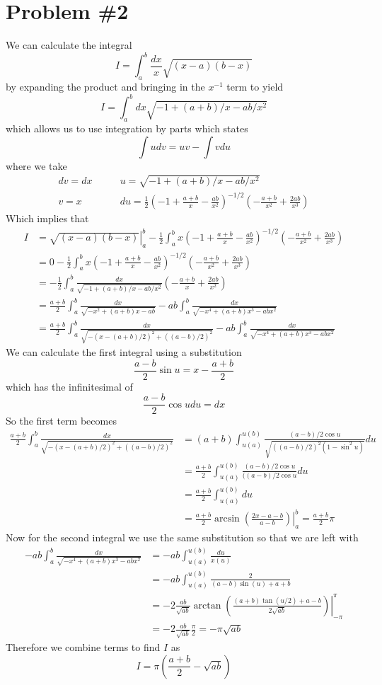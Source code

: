 \documentclass[11pt]{article}
\numberwithin{equation}{section}
\begin{document}
\pagebreak

\section{Problem \#2}
We can calculate the integral
$$I = \int_{a}^{b} \frac{dx}{x}\sqrt{(x-a)(b-x)}$$
by expanding the product and bringing in the $x^{-1}$ term to yield
$$I = \int_{a}^{b}dx\sqrt{-1+(a+b)/x-ab/x^2}$$
which allows us to use integration by parts which states 
$$\int udv = uv - \int vdu$$
where we take
\begin{align*}
dv = dx &\qquad u = \sqrt{-1+(a+b)/x-ab/x^2}\\
v = x &\qquad du = \frac{1}{2}\left(-1+\frac{a+b}{x}-\frac{ab}{x^2}\right)^{-1/2}\left(-\frac{a+b}{x^2}+\frac{2ab}{x^3}\right)
\end{align*}
Which implies that
\begin{align*}
I &= \left.\sqrt{(x-a)(b-x)}\right|_{a}^{b} - \frac{1}{2}\int_{a}^{b}x\left(-1+\frac{a+b}{x}-\frac{ab}{x^2}\right)^{-1/2}\left(-\frac{a+b}{x^2}+\frac{2ab}{x^3}\right)\\
&= 0 - \frac{1}{2}\int_{a}^{b}x\left(-1+\frac{a+b}{x}-\frac{ab}{x^2}\right)^{-1/2}\left(-\frac{a+b}{x^2}+\frac{2ab}{x^3}\right)\\
&= - \frac{1}{2}\int_{a}^{b}\frac{dx}{\sqrt{-1+(a+b)/{x}-{ab}/{x^2}}}\left(-\frac{a+b}{x}+\frac{2ab}{x^2}\right)\\
&= \frac{a+b}{2}\int_{a}^{b}\frac{dx}{\sqrt{-x^2+(a+b)x-ab}} - ab\int_{a}^{b}\frac{dx}{\sqrt{-x^4+(a+b)x^3-abx^2}}\\
&= \frac{a+b}{2}\int_{a}^{b}\frac{dx}{\sqrt{-(x-(a+b)/2)^2 + ((a-b)/2)^2}} - ab\int_{a}^{b}\frac{dx}{\sqrt{-x^4+(a+b)x^3-abx^2}}
\end{align*}
We can calculate the first integral using a substitution 
$$\frac{a-b}{2}\sin{u} = x - \frac{a+b}{2}$$
which has the infinitesimal of
$$\frac{a-b}{2}\cos{u}du = dx$$
So the first term becomes
\begin{align*}
\frac{a+b}{2}\int_{a}^{b}\frac{dx}{\sqrt{-(x-(a+b)/2)^2 + ((a-b)/2)^2}} &= (a+b)\int_{u(a)}^{u(b)}\frac{(a-b)/2\cos{u}}{\sqrt{((a-b)/2)^2(1-\sin^2u)}}du\\
&= \frac{a+b}{2}\int_{u(a)}^{u(b)}\frac{(a-b)/2\cos{u}}{((a-b)/2\cos{u}}du\\
&= \frac{a+b}{2}\int_{u(a)}^{u(b)}du\\
&= \frac{a+b}{2}\left.\arcsin\left(\frac{2x-a-b}{a-b}\right)\right|_{a}^{b} = \frac{a+b}{2}\pi
\end{align*}
Now for the second integral we use the same substitution so that we are left with
\begin{align*}
-ab\int_{a}^{b}\frac{dx}{\sqrt{-x^4+(a+b)x^3-abx^2}} &= -ab\int_{u(a)}^{u(b)}\frac{du}{x(u)}\\
&= -ab\int_{u(a)}^{u(b)}\frac{2}{(a-b)\sin(u)+a+b}\\
&= -2\frac{ab}{\sqrt{ab}}\left.\arctan\left(\frac{(a+b)\tan(u/2)+a-b}{2\sqrt{ab}}\right)\right|_{-\pi}^{\pi}\\
&= -2\frac{ab}{\sqrt{ab}}\frac{\pi}{2} = -\pi\sqrt{ab}
\end{align*}
Therefore we combine terms to find $I$ as
$$I = \pi\left(\frac{a+b}{2}-\sqrt{ab}\right)$$
\end{document}
